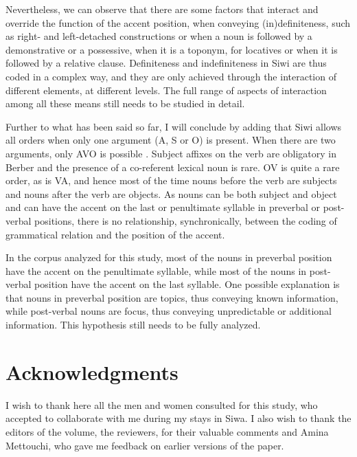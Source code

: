 \documentclass[output=paper]{langsci/langscibook}
\begin{document}
Nevertheless, we can observe that there are some factors that interact and override the function of the accent position, when conveying (in)definiteness, such as right- and left-detached constructions or when a noun is followed by a demonstrative or a possessive, when it is a toponym, for locatives or when it is followed by a relative clause. Definiteness and indefiniteness in Siwi are thus coded in a complex way, and they are only achieved through the interaction of different elements, at different levels. The full range of aspects of interaction among all these means still needs to be studied in detail.

Further to what has been said so far, I will conclude by adding that Siwi allows all orders when only one argument (A, S or O) is present. When there are two arguments, only AVO is possible \citep[][288-289]{mettouchi:schiattarella:18}. Subject affixes on the verb are obligatory in Berber and the presence of a co-referent lexical noun is rare. OV is quite a rare order, as is VA, and hence most of the time nouns before the verb are subjects and nouns after the verb are objects. As nouns can be both subject and object and can have the accent on the last or penultimate syllable in preverbal or post-verbal positions, there is no relationship, synchronically, between the coding of grammatical relation and the position of the accent.

In the corpus analyzed for this study, most of the nouns in preverbal position have the accent on the penultimate syllable, while most of the nouns in post-verbal position have the accent on the last syllable. One possible explanation is that nouns in preverbal position are topics, thus conveying known information, while post-verbal nouns are focus, thus conveying unpredictable or additional information. This hypothesis still needs to be fully analyzed.

\section*{Acknowledgments}
I wish to thank here all the men and women consulted for this study, who accepted to collaborate with me during my stays in Siwa. I also wish to thank the editors of the volume, the reviewers, for their valuable comments and Amina Mettouchi, who gave me feedback on earlier versions of the paper.
\end{document}
